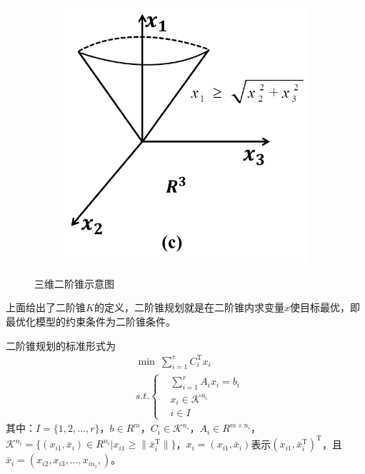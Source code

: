 \begin{figure}[H]
\begin{subfigure}[b]{0.3\textwidth}
                \includegraphics[width=\textwidth]{images/Three_dimensional_2order_cone3.jpg}
                \end{subfigure}
            \caption{三维二阶锥示意图}
            \label{fig:三维二阶锥示意图}
            \end{figure}
        \par
        上面给出了二阶锥$K$的定义，二阶锥规划就是在二阶锥内求变量$x$使目标最优，即最优化模型的约束条件为二阶锥条件。
        \par
        二阶锥规划的标准形式为
        \begin{align*}
          & \mathop{\min} \ \mathop{\sum}\limits_{i=1}^rC_i^\mathrm{T} x_i\\
          & s.t.\left\{
            \begin{aligned}
          & \mathop{\sum}\limits_{i=1}^rA_ix_i=b_i\\
          & x_i \in \mathcal{K}^{n_i}\\
          & i \in I
            \end{aligned}
             \right.
        \end{align*}
        其中：$I=\{1,2,\ldots,r\}$，$b \in R^m$，$C_i \in \mathcal{K}^{n_i}$，$A_i \in R^{m\times n_i}$，$\mathcal{K}^{n_i}=\{(x_{i1},{\bar{x}}_i) \in R^{n_i}|x_{i1}\geqslant \|{\bar{x}}_i^\mathrm{T} \| \}$，$x_i=(x_{i1},{\bar{x}}_i)$表示$(x_{i1} ,{\bar{x}}_i^\mathrm{T} )^\mathrm{T} $，且${\bar{x}}_i=(x_{i2},x_{i3},\ldots,x_{in_i},)$。
